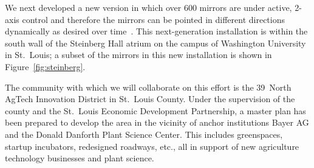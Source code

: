 We next developed a
new version in which over 600 mirrors are under 
active, 2-axis control and therefore the mirrors
can be pointed in different directions dynamically as desired over
time~\cite{acmbg19,acmb18,cagm18}. 
This next-generation installation is within 
the south wall of the Steinberg Hall atrium on the campus of 
Washington University in St.~Louis; a subset of the mirrors in this new
installation is shown in Figure~\ref{fig:steinberg}.

The community with which we will collaborate on this effort is
the 39~North AgTech Innovation District in St.~Louis County. Under the
supervision of the county and the St.~Louis Economic Development Partnership, 
a master plan has been prepared to develop the area in the vicinity of  
anchor institutions Bayer AG and the Donald Danforth Plant Science Center. 
This includes greenspaces, startup incubators, redesigned roadways, etc.,
all in support of new agriculture technology businesses and plant science.
